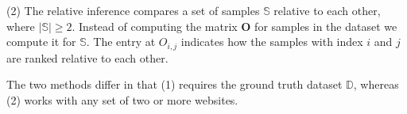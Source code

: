 (2) The relative inference compares a set of samples $\mathbb{S}$ relative to each other, where $\left\lvert\mathbb{S}\right\rvert\ge2$. Instead of computing the matrix $\bm{O}$ for samples in the dataset we compute it for $\mathbb{S}$. The entry at $O_{i,j}$ indicates how the samples with index $i$ and $j$ are ranked relative to each other.

The two methods differ in that (1) requires the ground truth dataset $\mathbb{D}$, whereas (2) works with any set of two or more websites.
